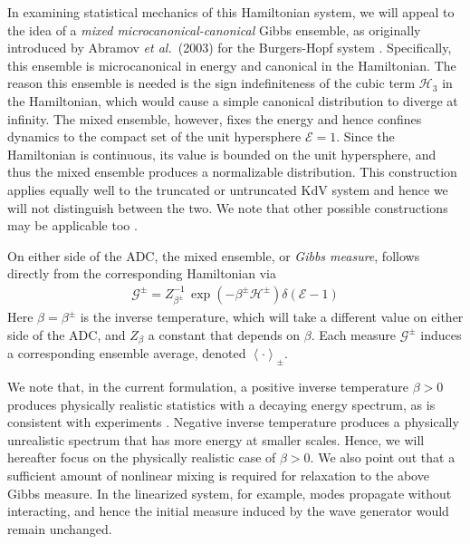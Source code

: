 \documentclass[11pt]{article}
\newcommand{\new}[1]{{ #1}}
\newcommand{\mean}[1]{\left< #1 \right>}
\newcommand{\En}{\mathcal{E}}
\newcommand{\Ham}{\mathcal{H}}
\newcommand{\Hupdn}{\Ham^{\pm}}
\newcommand{\Hthree}{\Ham_{3}}
\newcommand{\Gibbs}{\mathcal{G}}
\newcommand{\Gupdn}{\Gibbs^{\pm}}
\newcommand{\invtemp}{\beta}
\newcommand{\itupdn}{\invtemp^{\pm}}
\begin{document}
	In examining statistical mechanics of this Hamiltonian system, we will appeal to the idea of a {\em mixed microcanonical-canonical} Gibbs ensemble, as originally introduced by Abramov {\it et al.}~(2003) for the Burgers-Hopf system \cite{abramov2003}. Specifically, this ensemble is microcanonical in energy and canonical in the Hamiltonian. The reason this ensemble is needed is the sign indefiniteness of the cubic term $\Hthree$ in the Hamiltonian, which would cause a simple canonical distribution to diverge at infinity. The mixed ensemble, however, fixes the energy and hence confines dynamics to the compact set of the unit hypersphere $\En = 1$. Since the Hamiltonian is continuous, its value is bounded on the unit hypersphere, and thus the mixed ensemble produces a normalizable distribution. This construction applies equally well to the truncated or untruncated KdV system and hence we will not distinguish between the two. We note that other possible constructions may be applicable too \cite{kleeman2014nonequilibrium}.
	
	On either side of the ADC, the mixed ensemble, or {\em Gibbs measure}, follows directly from the corresponding Hamiltonian via
\begin{align}
\label{Gibbs}
\Gupdn = Z_{\itupdn}^{-1} \, \exp(-\itupdn \Hupdn) \delta(\En - 1)
\end{align}
Here $\invtemp = \itupdn$ is the inverse temperature, which will take a different value on either side of the ADC, and $Z_{\invtemp}$ a constant that depends on $\invtemp$. Each measure $\Gupdn$ induces a corresponding ensemble average, denoted $\mean{\cdot}_{\pm}$. 

	We note that, in the current formulation, a positive inverse temperature $\invtemp > 0$ produces physically realistic statistics with a decaying energy spectrum, as is consistent with experiments \cite{majda2019, bajars2013weakly}. Negative inverse temperature produces a physically unrealistic spectrum that has more energy at smaller scales. Hence, we will hereafter focus on the physically realistic case of $\invtemp > 0$. \new{We also point out that a sufficient amount of nonlinear mixing is required for relaxation to the above Gibbs measure. In the linearized system, for example, modes propagate without interacting, and hence the initial measure induced by the wave generator would remain unchanged.}


\end{document}

